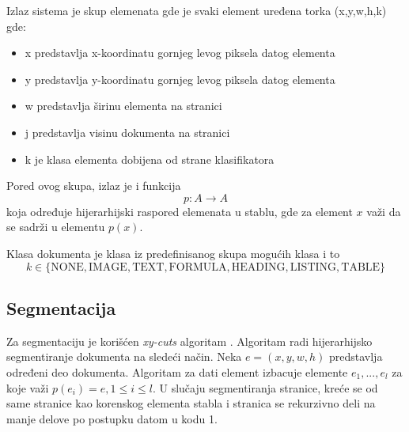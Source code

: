 \documentclass[]{amsart}
\begin{document}
Izlaz sistema je skup elemenata gde je svaki element uređena torka (x,y,w,h,k) gde:

\begin{itemize}
\item x predstavlja x-koordinatu gornjeg levog piksela datog elementa
\item y predstavlja y-koordinatu gornjeg levog piksela datog elementa
\item w predstavlja širinu elementa na stranici
\item j predstavlja visinu dokumenta na stranici
\item k je klasa elementa dobijena od strane klasifikatora
\end{itemize}

Pored ovog skupa, izlaz je i funkcija $$ p : A \to A $$ koja određuje hijerarhijski raspored elemenata u stablu, gde za element $ x $ važi da se
sadrži u elementu $ p(x) $. 

Klasa dokumenta je klasa iz predefinisanog skupa mogućih klasa i to $$ k \in \{\text{NONE}, \text{IMAGE}, \text{TEXT}, \text{FORMULA}, \text{HEADING}, \text{LISTING}, \text{TABLE}\} $$ 



\subsection{Segmentacija}
\label{sec:org7eee69b}

Za segmentaciju je korišćen \textit{xy-cuts} algoritam \cite{ha1995recursive}. Algoritam radi hijerarhijsko segmentiranje dokumenta na sledeći način. Neka $ e = (x,y,w,h) $ predstavlja određeni
deo dokumenta. Algoritam za dati element izbacuje elemente $ e_1, ..., e_l $ za koje važi $ p(e_i) = e, 1 \le i \le l $. U slučaju segmentiranja stranice, kreće se od same stranice kao korenskog elementa
stabla i stranica se rekurzivno deli na manje delove po postupku datom u kodu 1.
\end{document}
